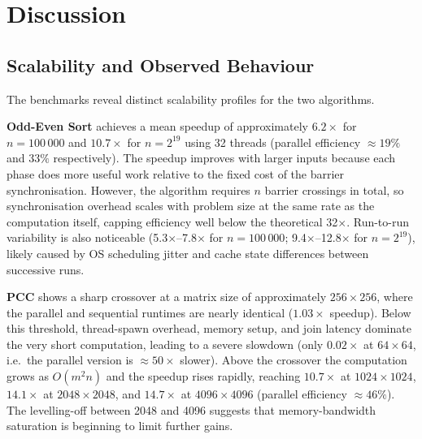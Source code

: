 \documentclass[11pt,a4paper]{article}
\begin{document}
\section{Discussion}

\subsection{Scalability and Observed Behaviour}

The benchmarks reveal distinct scalability profiles for the two algorithms.

\textbf{Odd-Even Sort} achieves a mean speedup of approximately $6.2\times$ for $n = 100\,000$
and $10.7\times$ for $n = 2^{19}$ using 32 threads (parallel efficiency $\approx 19\%$ and $33\%$
respectively). The speedup improves with larger inputs because each phase does more useful work
relative to the fixed cost of the barrier synchronisation. However, the algorithm requires $n$
barrier crossings in total, so synchronisation overhead scales with problem size at the same
rate as the computation itself, capping efficiency well below the theoretical 32$\times$. Run-to-run
variability is also noticeable (5.3$\times$--7.8$\times$ for $n = 100\,000$;
9.4$\times$--12.8$\times$ for $n = 2^{19}$), likely caused by OS scheduling jitter and cache state
differences between successive runs.

\textbf{PCC} shows a sharp crossover at a matrix size of approximately $256 \times 256$, where
the parallel and sequential runtimes are nearly identical ($1.03\times$ speedup). Below this
threshold, thread-spawn overhead, memory setup, and join latency dominate the very short
computation, leading to a severe slowdown (only $0.02\times$ at $64 \times 64$, i.e.\
the parallel version is $\approx 50\times$ slower). Above the crossover the computation grows as
$O(m^{2}n)$ and the speedup rises rapidly, reaching $10.7\times$ at $1024 \times 1024$,
$14.1\times$ at $2048 \times 2048$, and $14.7\times$ at $4096 \times 4096$ (parallel efficiency
$\approx 46\%$). The levelling-off between 2048 and 4096 suggests that memory-bandwidth saturation
is beginning to limit further gains.
\end{document}
